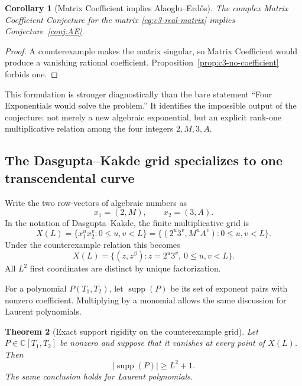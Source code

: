\documentclass[11pt,oneside]{article}
\newtheorem{theorem}{Theorem}[section]
\newtheorem{corollary}[theorem]{Corollary}
\theoremstyle{definition}
\theoremstyle{remark}
\newcommand{\C}{\mathbb C}
\newcommand{\supp}{\operatorname{supp}}
\begin{document}
\begin{corollary}[Matrix Coefficient implies Alaoglu--Erd\H{o}s]
\label{cor:c3-MCC-implies-AE}
The complex Matrix Coefficient Conjecture for the matrix \eqref{eq:c3-real-matrix} implies
Conjecture~\ref{conj:AE}.
\end{corollary}

\begin{proof}
A counterexample makes the matrix singular, so Matrix Coefficient would produce a vanishing
rational coefficient.  Proposition~\ref{prop:c3-no-coefficient} forbids one.
\end{proof}

This formulation is stronger diagnostically than the bare statement ``Four Exponentials would
solve the problem.''  It identifies the impossible output of the conjecture: not merely a
new algebraic exponential, but an explicit rank-one multiplicative relation among the four
integers $2,M,3,A$.

\subsection{The Dasgupta--Kakde grid specializes to one transcendental curve}
\label{sec:c3-DK-grid}

Write the two row-vectors of algebraic numbers as
\[
 x_1=(2,M),\qquad x_2=(3,A).
\]
In the notation of Dasgupta--Kakde, the finite multiplicative grid is
\begin{equation}\label{eq:c3-grid}
 X(L)=\{x_1^ux_2^v:0\le u,v<L\}
 =\{(2^u3^v,M^uA^v):0\le u,v<L\}.
\end{equation}
Under the counterexample relation this becomes
\begin{equation}\label{eq:c3-grid-curve}
 X(L)=\{(z,z^\beta):z=2^u3^v,\ 0\le u,v<L\}.
\end{equation}
All $L^2$ first coordinates are distinct by unique factorization.

For a polynomial $P(T_1,T_2)$, let $\supp(P)$ be its set of exponent pairs with nonzero
coefficient.  Multiplying by a monomial allows the same discussion for Laurent polynomials.

\begin{theorem}[Exact support rigidity on the counterexample grid]
\label{thm:c3-support-rigidity}
Let $P\in\C[T_1,T_2]$ be nonzero and suppose that it vanishes at every point of $X(L)$.
Then
\begin{equation}\label{eq:c3-support-lower}
  |\supp(P)|\ge L^2+1.
\end{equation}
The same conclusion holds for Laurent polynomials.
\end{theorem}
\end{document}
